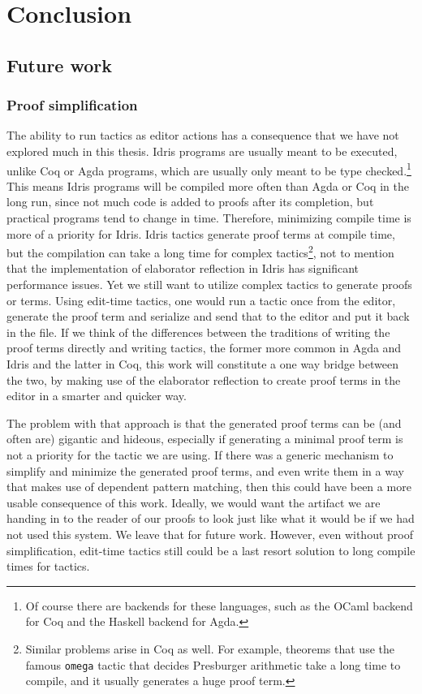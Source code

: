 \chapter{Conclusion}\label{chap:conclusion}

\section{Future work}

\subsection{Proof simplification}

The ability to run tactics as editor actions has a consequence
that we have not explored much in this thesis.
Idris programs are usually meant to be executed, unlike Coq or
Agda programs, which are usually only meant to be type checked.\footnote{Of
  course there are backends for these languages, such as the OCaml
  backend for Coq and the Haskell backend for Agda.}
This means Idris programs will be compiled more often than Agda or Coq in the
long run, since not much code is added to proofs after its completion, but
practical programs tend to change in time. Therefore, minimizing compile time
is more of a priority for Idris.
Idris tactics generate proof terms at compile time, but the
compilation can take a long time for complex tactics\footnote{Similar problems
arise in Coq as well. For example, theorems that use the famous \texttt{omega}
tactic that decides Presburger arithmetic\cite{omega} take a long time to compile, and it
usually generates a huge proof term.},
not to mention that the implementation of elaborator
reflection in Idris has significant performance issues.\cite{leanmeta}
Yet we still want to utilize complex tactics to generate proofs or terms.
Using edit-time tactics, one would run a tactic once from the editor, generate
the proof term and serialize and send that to the editor and put it back in the
file.
If we think of the differences between the traditions of writing the proof
terms directly and writing tactics, the former more common in Agda and Idris
and the latter in Coq, this work will constitute a one way bridge
between the two, by making use of the elaborator reflection to create proof
terms in the editor in a smarter and quicker way.

The problem with that approach is that the generated proof terms can be (and
often are) gigantic and hideous, especially if generating a minimal proof term
is not a priority for the tactic we are using.
If there was a generic mechanism to simplify and minimize the generated proof
terms, and even write them in a way that makes use of dependent pattern
matching, then this could have been a more usable consequence of this work.
Ideally, we would want the artifact we are handing in to the reader of our
proofs to look just like what it would be if we had not used this system.
We leave that for future work.  However, even without proof simplification,
edit-time tactics still could be a last resort solution to long compile times
for tactics.

